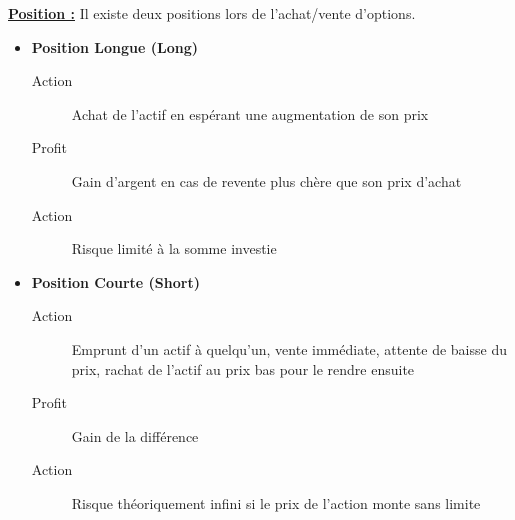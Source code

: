 \underline{\textbf{Position :}} Il existe deux positions lors de l'achat/vente d'options. \\
\begin{itemize}
    \item \textbf{Position Longue (Long)}
    \begin{description}
        \item[Action] Achat de l'actif en espérant une augmentation de son prix
        \item[Profit] Gain d'argent en cas de revente plus chère que son prix d'achat
        \item[Action] Risque limité à la somme investie
    \end{description}
    \item \textbf{Position Courte (Short)}
    \begin{description}
        \item[Action] Emprunt d'un actif à quelqu'un, vente immédiate, attente de baisse du prix, rachat de l'actif au prix bas pour le rendre ensuite
        \item[Profit] Gain de la différence
        \item[Action] Risque théoriquement infini si le prix de l'action monte sans limite
    \end{description}
\end{itemize}
